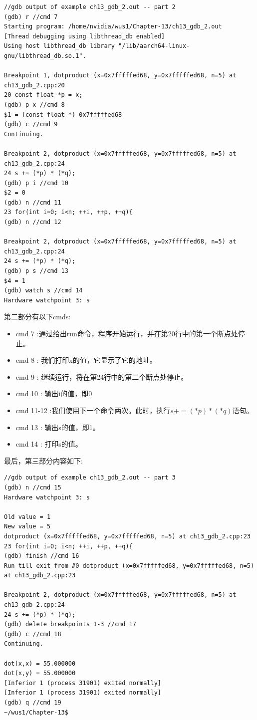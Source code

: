 \begin{lstlisting}[caption={}]
//gdb output of example ch13_gdb_2.out -- part 2
(gdb) r //cmd 7
Starting program: /home/nvidia/wus1/Chapter-13/ch13_gdb_2.out
[Thread debugging using libthread_db enabled]
Using host libthread_db library "/lib/aarch64-linux-gnu/libthread_db.so.1".

Breakpoint 1, dotproduct (x=0x7fffffed68, y=0x7fffffed68, n=5) at
ch13_gdb_2.cpp:20
20 const float *p = x;
(gdb) p x //cmd 8
$1 = (const float *) 0x7fffffed68
(gdb) c //cmd 9
Continuing.

Breakpoint 2, dotproduct (x=0x7fffffed68, y=0x7fffffed68, n=5) at
ch13_gdb_2.cpp:24
24 s += (*p) * (*q);
(gdb) p i //cmd 10
$2 = 0
(gdb) n //cmd 11
23 for(int i=0; i<n; ++i, ++p, ++q){
(gdb) n //cmd 12

Breakpoint 2, dotproduct (x=0x7fffffed68, y=0x7fffffed68, n=5) at
ch13_gdb_2.cpp:24
24 s += (*p) * (*q);
(gdb) p s //cmd 13
$4 = 1
(gdb) watch s //cmd 14
Hardware watchpoint 3: s
\end{lstlisting}

第二部分有以下cmds: \par

\begin{itemize}
	\item cmd 7 :通过给出run命令，程序开始运行，并在第20行中的第一个断点处停止。
	\item cmd 8 : 我们打印x的值，它显示了它的地址。
	\item cmd 9 : 继续运行，将在第24行中的第二个断点处停止。
	\item cmd 10 : 输出i的值，即0
	\item cmd 11-12 :我们使用下一个命令两次。此时，执行$ s += (*p)*(*q) $语句。
	\item cmd 13 : 输出s的值，即1。
	\item cmd 14 : 打印s的值。
\end{itemize}

最后，第三部分内容如下: \par

\begin{lstlisting}[caption={}]
//gdb output of example ch13_gdb_2.out -- part 3
(gdb) n //cmd 15
Hardware watchpoint 3: s

Old value = 1
New value = 5
dotproduct (x=0x7fffffed68, y=0x7fffffed68, n=5) at ch13_gdb_2.cpp:23
23 for(int i=0; i<n; ++i, ++p, ++q){
(gdb) finish //cmd 16
Run till exit from #0 dotproduct (x=0x7fffffed68, y=0x7fffffed68, n=5) at ch13_gdb_2.cpp:23

Breakpoint 2, dotproduct (x=0x7fffffed68, y=0x7fffffed68, n=5) at
ch13_gdb_2.cpp:24
24 s += (*p) * (*q);
(gdb) delete breakpoints 1-3 //cmd 17
(gdb) c //cmd 18
Continuing.

dot(x,x) = 55.000000
dot(x,y) = 55.000000
[Inferior 1 (process 31901) exited normally]
[Inferior 1 (process 31901) exited normally]
(gdb) q //cmd 19
~/wus1/Chapter-13$
\end{lstlisting}

